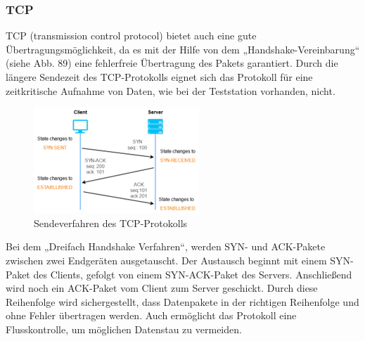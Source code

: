 \subsubsection{TCP}
TCP\autocite{TCP} (transmission control protocol) bietet auch eine gute Übertragungsmöglichkeit, da es mit der Hilfe von dem „Handshake-Vereinbarung“ (siehe Abb. 89) eine fehlerfreie Übertragung des Pakets garantiert. Durch die längere Sendezeit des TCP-Protokolls eignet sich das Protokoll für eine zeitkritische Aufnahme von Daten, wie bei der Teststation vorhanden, nicht.\\
\vspace{3mm}
\begin{figure}[H]
	\centering
	\includegraphics[scale=1.1]{image/sendeverfahren.png}
	\caption{Sendeverfahren des TCP-Protokolls\autocite{TCP-Handshake}}
\end{figure}
\vspace{3mm}
Bei dem „Dreifach Handshake Verfahren“, werden SYN- und ACK-Pakete zwischen zwei Endgeräten ausgetauscht. Der Austausch beginnt mit einem SYN-Paket des Clients, gefolgt von einem SYN-ACK-Paket des Servers. Anschließend wird noch ein ACK-Paket vom Client zum Server geschickt. Durch diese Reihenfolge wird sichergestellt, dass Datenpakete in der richtigen Reihenfolge und ohne Fehler übertragen werden. Auch ermöglicht das Protokoll eine Flusskontrolle, um möglichen Datenstau zu vermeiden.

